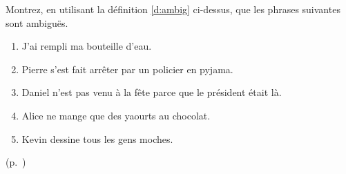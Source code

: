\begin{exo}[Ambiguïtés]\label{exo:1Ambig}
Montrez, en utilisant la définition \ref{d:ambig} ci-dessus, que les phrases suivantes
sont ambiguës.

\begin{enumerate}
\item J'ai rempli ma bouteille d'eau.
\item Pierre s'est fait arrêter par un policier en pyjama. 
\item Daniel n'est pas venu à la fête parce que le président était là.
\item Alice ne mange que des yaourts au chocolat. 
\item Kevin dessine tous les gens moches.
\end{enumerate}
\begin{solu}(p.~\pageref{exo:1Ambig})\label{crg:1Ambig}


\end{solu}
\end{exo}
